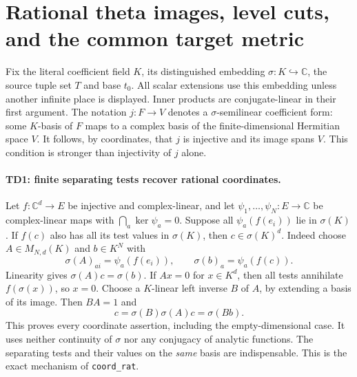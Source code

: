 \section{Rational theta images, level cuts, and the common target metric}\label{sec:theta-descent}


Fix the literal coefficient field $K$, its distinguished embedding
$\sigma:K\hookrightarrow\mathbb C$, the source tuple set $T$ and base
$t_0$. All scalar extensions use this embedding unless another infinite
place is displayed. Inner products are conjugate-linear in their first
argument. The notation $j:F\to V$ denotes a $\sigma$-semilinear
coefficient form: some $K$-basis of $F$ maps to a complex basis of the
finite-dimensional Hermitian space $V$. It follows, by coordinates,
that $j$ is injective and its image spans $V$. This condition is stronger
than injectivity of $j$ alone.

\paragraph{TD1: finite separating tests recover rational coordinates.}
Let $f:\mathbb C^d\to E$ be injective and complex-linear, and let
$\psi_1,\ldots,\psi_N:E\to\mathbb C$ be complex-linear maps with
$\bigcap_a\ker\psi_a=0$. Suppose all
$\psi_a(f(e_i))$ lie in $\sigma(K)$. If $f(c)$ also has all its test
values in $\sigma(K)$, then $c\in\sigma(K)^d$.
Indeed choose $A\in M_{N,d}(K)$ and $b\in K^N$ with
\[
 \sigma(A)_{ai}=\psi_a(f(e_i)),\qquad
 \sigma(b)_a=\psi_a(f(c)).
\]
Linearity gives $\sigma(A)c=\sigma(b)$. If $Ax=0$ for $x\in K^d$,
then all tests annihilate $f(\sigma(x))$, so $x=0$. Choose a
$K$-linear left inverse $B$ of $A$, by extending a basis of its image.
Then $BA=1$ and
\[
 c=\sigma(B)\sigma(A)c=\sigma(Bb).
\]
This proves every coordinate assertion, including the empty-dimensional
case. It uses neither continuity of $\sigma$ nor any conjugacy of analytic
functions. The separating tests and their values on the \emph{same}
basis are indispensable. This is the exact mechanism of
\texttt{coord\_rat}.

